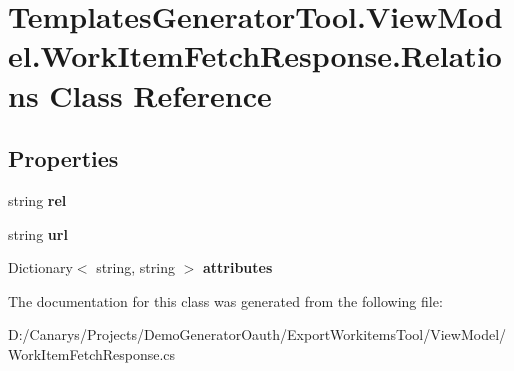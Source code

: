 \hypertarget{class_templates_generator_tool_1_1_view_model_1_1_work_item_fetch_response_1_1_relations}{}\section{Templates\+Generator\+Tool.\+View\+Model.\+Work\+Item\+Fetch\+Response.\+Relations Class Reference}
\label{class_templates_generator_tool_1_1_view_model_1_1_work_item_fetch_response_1_1_relations}
\subsection*{Properties}
\begin{DoxyCompactItemize}
\item 
\mbox{\label{class_templates_generator_tool_1_1_view_model_1_1_work_item_fetch_response_1_1_relations_ad309a858400b6dfb3ee59dde4042cfd1}} 
string {\bfseries rel}
\item 
\mbox{\label{class_templates_generator_tool_1_1_view_model_1_1_work_item_fetch_response_1_1_relations_a6c926c5f7589702d85c26aa9a78334c6}} 
string {\bfseries url}
\item 
\mbox{\label{class_templates_generator_tool_1_1_view_model_1_1_work_item_fetch_response_1_1_relations_a41b54378c223e826d29af0cc8bc686e8}} 
Dictionary$<$ string, string $>$ {\bfseries attributes}
\end{DoxyCompactItemize}


The documentation for this class was generated from the following file\+:\begin{DoxyCompactItemize}
\item 
D\+:/\+Canarys/\+Projects/\+Demo\+Generator\+Oauth/\+Export\+Workitems\+Tool/\+View\+Model/Work\+Item\+Fetch\+Response.\+cs\end{DoxyCompactItemize}
